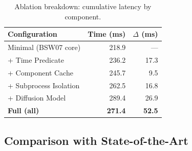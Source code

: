 \documentclass[lettersize,journal]{IEEEtran}
\begin{document}
\begin{table}[t]
\caption{Ablation breakdown: cumulative latency by component.}
\label{tab:ablation}
\centering
\footnotesize
\begin{tabular}{l r r}
\toprule
\textbf{Configuration} & \textbf{Time (ms)} & \textbf{$\Delta$ (ms)} \\
\midrule
Minimal (BSW07 core)  & 218.9 & --- \\
+ Time Predicate      & 236.2 & 17.3 \\
+ Component Cache     & 245.7 & 9.5 \\
+ Subprocess Isolation & 262.5 & 16.8 \\
+ Diffusion Model     & 289.4 & 26.9 \\
\textbf{Full (all)}   & \textbf{271.4} & \textbf{52.5} \\
\bottomrule
\end{tabular}
\end{table}

\subsection{Comparison with State-of-the-Art}
\label{subsec:sota}

\begin{table}[t]
\centering
\caption{Theoretical complexity comparison among CP-ABE schemes.}
\label{tab:sota_complexity}
\end{table}
\end{document}
